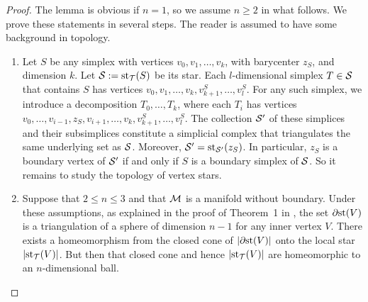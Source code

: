 \documentclass[10pt,letterpaper]{article}
\begin{document}
\begin{proof}
    The lemma is obvious if $n = 1$, so we assume $n \geq 2$ in what follows. 
    We prove these statements in several steps. 
    The reader is assumed to have some background in topology. 
    \begin{enumerate}
    \item 
    Let $S$ be any simplex with vertices $v_0, v_1, \dots, v_k$, with barycenter $z_{S}$, and dimension $k$.
    Let ${\mathcal S} := \operatorname{st}_{{\mathcal T}}(S)$ be its star. 
    Each $l$-dimensional simplex $T \in {\mathcal S}$ that contains $S$ 
    has vertices $v_0, v_1, \dots, v_k, v_{k+1}^{S}, \dots, v_{l}^{S}$. 
    For any such simplex, we introduce a decomposition $T_{0}, \dots, T_{k}$, where each $T_{i}$ has vertices 
    $v_0, \dots, v_{i-1}, z_{S}, v_{i+1}, \dots, v_k, v_{k+1}^{S}, \dots, v_{l}^{S}$.
    The collection ${\mathcal S}'$ of these simplices and their subsimplices constitute a simplicial complex 
    that triangulates the same underlying set as ${\mathcal S}$.
    Moreover, ${\mathcal S}' = \operatorname{st}_{{\mathcal S}'}(z_{S})$. 
    In particular, $z_{S}$ is a boundary vertex of ${\mathcal S}'$ if and only if $S$ is a boundary simplex of ${\mathcal S}$. 
    So it remains to study the topology of vertex stars. 
    
    \item 
    Suppose that $2 \leq n \leq 3$ and that ${\mathcal M}$ is a manifold without boundary. 
    Under these assumptions, 
    as explained in the proof of Theorem~1 in \cite{Siebenmann1979},
    the set ${\partial \rm st}(V)$ is a triangulation of a sphere of dimension $n-1$ for any inner vertex $V$. 
    There exists a homeomorphism from the closed cone of $\left| {\partial \rm st}(V) \right|$ onto the local star $\left| \operatorname{st}_{{\mathcal T}}(V) \right|$.
    But then that closed cone and hence $\left| \operatorname{st}_{{\mathcal T}}(V) \right|$ are homeomorphic to an $n$-dimensional ball. 
    

\end{enumerate}
\end{proof}
\end{document}

